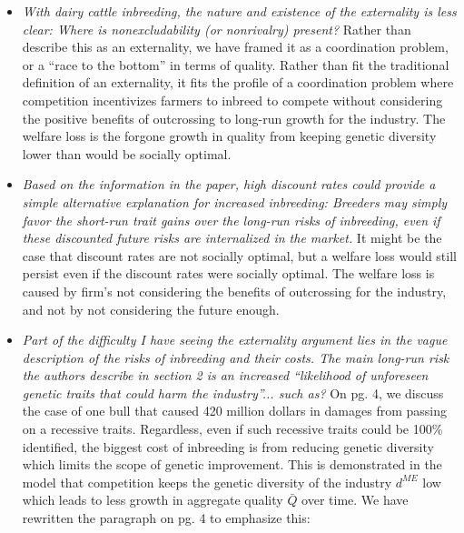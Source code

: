 \documentclass[12pt,letterpaper]{article}
\begin{document}
\begin{itemize}
\item \textit{With dairy cattle inbreeding, the nature and existence of the externality is less clear: Where is nonexcludability (or nonrivalry) present? } Rather than describe this as an externality, we have framed it as a coordination problem, or a ``race to the bottom'' in terms of quality. Rather than fit the traditional definition of an externality, it fits the profile of a coordination problem where competition incentivizes farmers to inbreed to compete without considering the positive benefits of outcrossing to long-run growth for the industry. The welfare loss is the forgone growth in quality from keeping genetic diversity lower than would be socially optimal.
\item \textit{Based on the information in the paper, high discount rates could provide a simple alternative explanation for increased inbreeding: Breeders may simply favor the short-run trait gains over the long-run risks of inbreeding, even if these discounted future risks are internalized in the
market.} It might be the case that discount rates are not socially optimal, but a welfare loss would still persist even if the discount rates were socially optimal. The welfare loss is caused by firm's not considering the benefits of outcrossing for the industry, and not by not considering the future enough.
\item \textit{Part of the difficulty I have seeing the externality argument lies in the vague description of the risks of inbreeding and their costs. The main long-run risk the authors describe in section 2 is an increased ``likelihood of unforeseen genetic traits that could harm the industry''... such as?} On pg. 4, we discuss the case of one bull that caused 420 million dollars in damages from passing on a recessive traits. Regardless, even if such recessive traits could be 100\% identified, the biggest cost of inbreeding is from reducing genetic diversity which limits the scope of genetic improvement. This is demonstrated in the model that competition keeps the genetic diversity of the industry $d^{ME}$ low which leads to less growth in aggregate quality $\bar{Q}$ over time. We have rewritten the paragraph on pg. 4 to emphasize this: 


\end{itemize}
\end{document}
